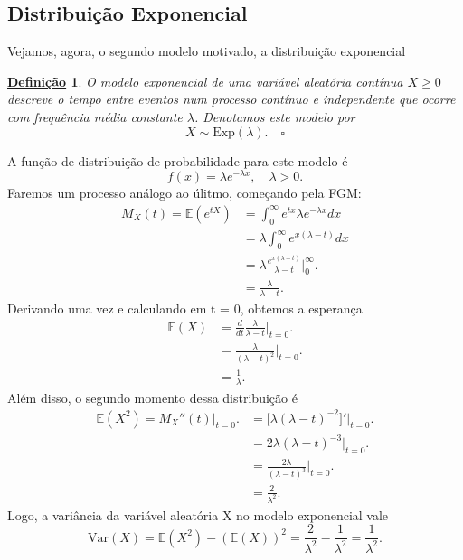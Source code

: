 \documentclass{article}
\newtheorem*{def*}{\underline{Defini\c c\~ao}}
\begin{document}
\subsection{Distribuição Exponencial}
Vejamos, agora, o segundo modelo motivado, a distribuição exponencial
\begin{def*}
  O \textit{modelo exponencial} de uma variável aleatória contínua \(X\geq 0\) descreve
  o tempo entre eventos num processo contínuo e independente que ocorre com frequência média constante
  \(\lambda \). Denotamos este modelo por 
  \[
    X\sim \mathrm{Exp}(\lambda ).\quad\square
  \]
\end{def*}
A função de distribuição de probabilidade para este modelo é 
\[
  f(x) = \lambda e^{-\lambda x},\quad \lambda > 0.
\]
  Faremos um processo análogo ao úlitmo, começando pela FGM:
 \begin{align*}
  M_{X}(t) = \mathbb{E}(e^{tX}) &= \int_{0}^{\infty}e^{tx}\lambda e^{-\lambda x}dx\\
                                &= \lambda \int_{0}^{\infty}e^{x(\lambda - t)}dx\\
                                &= \lambda \frac{e^{x(\lambda -t)}}{\lambda -t}\biggl|_{0}^{\infty}\biggr.\\
                                &= \frac{\lambda }{\lambda -t}.
 \end{align*}
 Derivando uma vez e calculando em t = 0, obtemos a esperança 
\begin{align*}
  \mathbb{E}(X) &= \frac{d}{dt}\frac{\lambda }{\lambda -t}\biggl|_{t=0}^{}\biggr.\\
                &= \frac{\lambda }{(\lambda -t)^{2}}\biggl|_{t=0}^{}\biggr.\\
                &= \frac{1}{\lambda }.
\end{align*}
  Além disso, o segundo momento dessa distribuição é 
 \begin{align*}
   \mathbb{E}(X^{2}) = M_{X}''(t)\biggl|_{t=0}^{}\biggr. &= \biggl[\lambda(\lambda -t)^{-2}\biggr]'\biggl|_{t=0}^{}\biggr.\\
                                                         &= 2\lambda(\lambda -t)^{-3}\biggl|_{t=0}^{}\biggr.\\
                                                         &= \frac{2\lambda }{(\lambda-t)^{3}}\biggl|_{t=0}^{}\biggr.\\
                                                         &= \frac{2}{\lambda^{2}}.
 \end{align*}
 Logo, a variância da variável aleatória X no modelo exponencial vale 
  \[
    \mathrm{Var}(X) = \mathbb{E}(X^{2}) - (\mathbb{E}(X))^{2} = \frac{2}{\lambda^{2}}-\frac{1}{\lambda^{2}} = \frac{1}{\lambda^{2}}.
  \]
\end{document}
